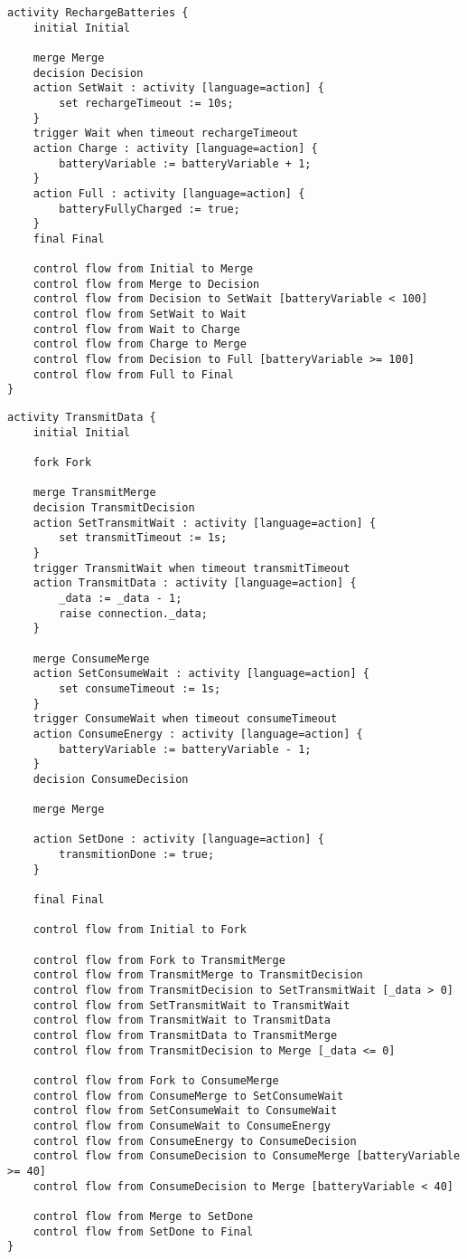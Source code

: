 \begin{lstlisting}[float,language=statechart, caption={The Gamma implementation of the Recharge Batteries activity.}]
activity RechargeBatteries {
	initial Initial
	
	merge Merge
	decision Decision
	action SetWait : activity [language=action] {
		set rechargeTimeout := 10s;
	}
	trigger Wait when timeout rechargeTimeout
	action Charge : activity [language=action] {
		batteryVariable := batteryVariable + 1;
	}
	action Full : activity [language=action] {
		batteryFullyCharged := true;
	}
	final Final
	
	control flow from Initial to Merge
	control flow from Merge to Decision
	control flow from Decision to SetWait [batteryVariable < 100]
	control flow from SetWait to Wait
	control flow from Wait to Charge
	control flow from Charge to Merge
	control flow from Decision to Full [batteryVariable >= 100]
	control flow from Full to Final
}
\end{lstlisting}

\begin{lstlisting}[float,language=statechart, caption={The Gamma implementation of the Transmit Data activity.}, label={}]
activity TransmitData {				
	initial Initial
	
	fork Fork
	
	merge TransmitMerge
	decision TransmitDecision
	action SetTransmitWait : activity [language=action] {
		set transmitTimeout := 1s;
	}
	trigger TransmitWait when timeout transmitTimeout
	action TransmitData : activity [language=action] {
		_data := _data - 1;
		raise connection._data;
	}
	
	merge ConsumeMerge
	action SetConsumeWait : activity [language=action] {
		set consumeTimeout := 1s;
	}
	trigger ConsumeWait when timeout consumeTimeout
	action ConsumeEnergy : activity [language=action] {
		batteryVariable := batteryVariable - 1;
	}
	decision ConsumeDecision
	
	merge Merge
	
	action SetDone : activity [language=action] {
		transmitionDone := true;
	}
	
	final Final
	
	control flow from Initial to Fork
	
	control flow from Fork to TransmitMerge
	control flow from TransmitMerge to TransmitDecision
	control flow from TransmitDecision to SetTransmitWait [_data > 0]
	control flow from SetTransmitWait to TransmitWait
	control flow from TransmitWait to TransmitData
	control flow from TransmitData to TransmitMerge
	control flow from TransmitDecision to Merge [_data <= 0]
	
	control flow from Fork to ConsumeMerge
	control flow from ConsumeMerge to SetConsumeWait
	control flow from SetConsumeWait to ConsumeWait
	control flow from ConsumeWait to ConsumeEnergy
	control flow from ConsumeEnergy to ConsumeDecision
	control flow from ConsumeDecision to ConsumeMerge [batteryVariable >= 40]
	control flow from ConsumeDecision to Merge [batteryVariable < 40]
	
	control flow from Merge to SetDone
	control flow from SetDone to Final
}
\end{lstlisting}

